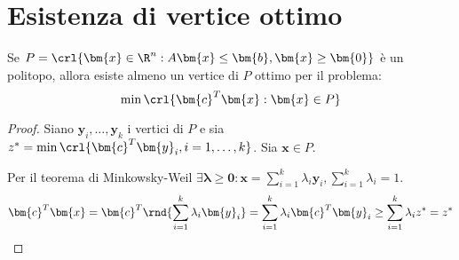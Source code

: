 \documentclass[\main/main.tex]{subfiles}
\begin{document}
\section{Esistenza di vertice ottimo}
\begin{theorem}
  Se $P = \crl{\bm{x} \in \R^n: A\bm{x} \leq \bm{b}, \bm{x} \geq \bm{0}}$ è un politopo, allora esiste almeno un vertice di $P$ ottimo per il problema:
  \[
    \min \crl{\bm{c}^T\bm{x}: \bm{x} \in P}
  \]
\end{theorem}

\begin{proof}
  Siano $\bm{y}_i, \ldots, \bm{y}_k$ i vertici di $P$ e sia $z^* = \min \crl{\bm{c}^T\bm{y}_i, i=1,\ldots,k}$. Sia $\bm{x} \in P$.

  Per il teorema di Minkowsky-Weil $\exists \bm{\lambda} \geq \bm{0}: \bm{x} = \sum_{i=1}^k \lambda_i \bm{y}_i, \sum_{i=1}^k \lambda_i =1$.
  \[
    \bm{c}^T\bm{x} = \bm{c}^T\rnd{\sum_{i=1}^k \lambda_i \bm{y}_i} = \sum_{i=1}^k \lambda_i \bm{c}^T\bm{y}_i \geq \sum_{i=1}^k \lambda_i z^* = z^*
  \]
\end{proof}
\end{document}
